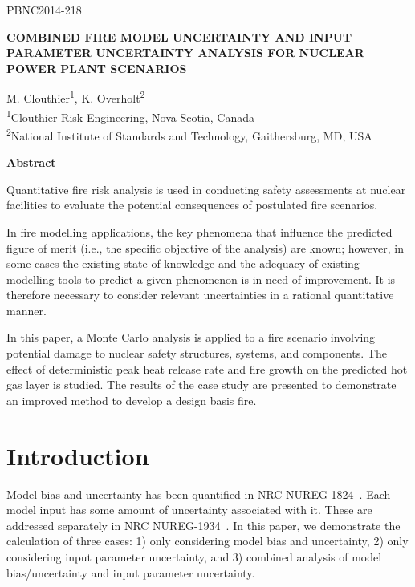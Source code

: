 \documentclass[12pt]{article}
\begin{document}
\begin{flushright}
PBNC2014-218
\end{flushright}

\begin{center}
\textbf{COMBINED FIRE MODEL UNCERTAINTY AND INPUT PARAMETER UNCERTAINTY ANALYSIS FOR NUCLEAR POWER PLANT SCENARIOS}
\end{center}

\begin{center}
M. Clouthier\textsuperscript{1}, K. Overholt\textsuperscript{2}\\

\textsuperscript{1}Clouthier Risk Engineering, Nova Scotia, Canada\\
\textsuperscript{2}National Institute of Standards and Technology, Gaithersburg, MD, USA
\end{center}

\begin{center}
\textbf{Abstract}
\end{center}

Quantitative fire risk analysis is used in conducting safety assessments at nuclear facilities to evaluate the potential consequences of postulated fire scenarios.

In fire modelling applications, the key phenomena that influence the predicted figure of merit (i.e., the specific objective of the analysis) are known; however, in some cases the existing state of knowledge and the adequacy of existing modelling tools to predict a given phenomenon is in need of improvement. It is therefore necessary to consider relevant uncertainties in a rational quantitative manner.

In this paper, a Monte Carlo analysis is applied to a fire scenario involving potential damage to nuclear safety structures, systems, and components. The effect of deterministic peak heat release rate and fire growth on the predicted hot gas layer is studied. The results of the case study are presented to demonstrate an improved method to develop a design basis fire.

\section{Introduction}
\label{sec:introduction}

Model bias and uncertainty has been quantified in NRC NUREG-1824~\cite{NUREG_1824_Sup_1}. Each model input has some amount of uncertainty associated with it. These are addressed separately in NRC NUREG-1934~\cite{NUREG_1934}. In this paper, we demonstrate the calculation of three cases: 1) only considering model bias and uncertainty, 2) only considering input parameter uncertainty, and 3) combined analysis of model bias/uncertainty and input parameter uncertainty.
\end{document}
